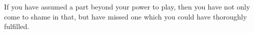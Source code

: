 If you have  assumed a part beyond your  power to play, then you  have not only
come to  shame in  that, but have  missed one which  you could  have thoroughly
fulfilled.
